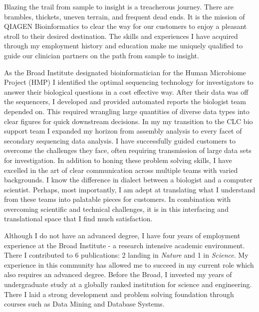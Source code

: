 \documentclass[10pt,letterpaper,sigleft]{newlfm}
\begin{document}
\begin{newlfm}


Blazing the trail from sample to insight is a treacherous journey. There are brambles, thickets, uneven terrain, and frequent dead ends. It is the mission of QIAGEN Bioinformatics to clear the way for our customers to enjoy a pleasant stroll to their desired destination. The skills and experiences I have acquired through my employment history and education make me uniquely qualified to guide our clinician partners on the path from sample to insight.

As the Broad Institute designated bioinformatician for the Human Microbiome Project (HMP) I identified the optimal sequencing technology for investigators to answer their biological questions in a cost effective way.  After their data was off the sequencers, I developed and provided automated reports the biologist team depended on. This required wrangling large quantities of diverse data types into clear figures for quick downstream decisions. In my my transition to the CLC bio support team I expanded my horizon from assembly analysis to every facet of secondary sequencing data analysis. I have successfully guided customers to overcome the challenges they face, often requiring transmission of large data sets for investigation. In addition to honing these problem solving skills, I have excelled in the art of clear communication across multiple teams with varied backgrounds. I know the difference in dialect between a biologist and a computer scientist. Perhaps, most importantly, I am adept at translating what I understand from these teams into palatable pieces for customers. In combination with overcoming scientific and technical challenges, it is in this interfacing and translational space that I find much satisfaction. 

Although I do not have an advanced degree, I have four years of employment experience at the Broad Institute - a research intensive academic environment. There I contributed to 6 publications:  2 landing in \emph{Nature} and 1 in \emph{Science}. My experience in this community has allowed me to succeed in my current role which also requires an advanced degree. Before the Broad, I invested my years of undergraduate study at a globally ranked institution for science and engineering. There I laid a strong development and problem solving foundation through courses such as Data Mining and Database Systems.


\end{newlfm}
\end{document}
